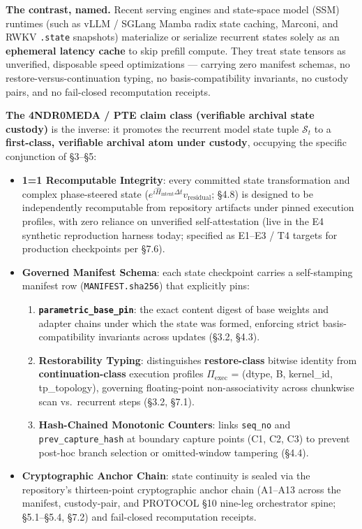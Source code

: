 \documentclass[11pt]{article}
\providecommand{\tightlist}{\setlength{\itemsep}{0pt}\setlength{\parskip}{0pt}}
\begin{document}
\textbf{The contrast, named.} Recent serving engines and state-space model (SSM) runtimes (such as vLLM / SGLang Mamba radix state caching, Marconi, and RWKV \texttt{.state} snapshots) materialize or serialize recurrent states solely as an \textbf{ephemeral latency cache} to skip prefill compute. They treat state tensors as unverified, disposable speed optimizations --- carrying zero manifest schemas, no restore-versus-continuation typing, no basis-compatibility invariants, no custody pairs, and no fail-closed recomputation receipts.

\textbf{The 4NDR0MEDA / PTE claim class (verifiable archival state custody)} is the inverse: it promotes the recurrent model state tuple \(\mathcal{S}_t\) to a \textbf{first-class, verifiable archival atom under custody}, occupying the specific conjunction of \S{}3--\S{}5:

\begin{itemize}
\tightlist
\item
  \textbf{1=1 Recomputable Integrity}: every committed state transformation and complex phase-steered state (\(e^{i\hat{H}_{\text{intent}}\Delta t} v_{\text{residual}}\); \S{}4.8) is designed to be independently recomputable from repository artifacts under pinned execution profiles, with zero reliance on unverified self-attestation (live in the E4 synthetic reproduction harness today; specified as E1--E3 / T4 targets for production checkpoints per \S{}7.6).
\item
  \textbf{Governed Manifest Schema}: each state checkpoint carries a self-stamping manifest row (\texttt{MANIFEST.sha256}) that explicitly pins:

  \begin{enumerate}
  \def\labelenumi{\arabic{enumi}.}
  \tightlist
  \item
    \textbf{\texttt{parametric\_base\_pin}}: the exact content digest of base weights and adapter chains under which the state was formed, enforcing strict basis-compatibility invariants across updates (\S{}3.2, \S{}4.3).
  \item
    \textbf{Restorability Typing}: distinguishes \textbf{restore-class} bitwise identity from \textbf{continuation-class} execution profiles \(\Pi_{\text{exec}}\) = (dtype, B, kernel\_id, tp\_topology), governing floating-point non-associativity across chunkwise scan vs.~recurrent steps (\S{}3.2, \S{}7.1).
  \item
    \textbf{Hash-Chained Monotonic Counters}: links \texttt{seq\_no} and \texttt{prev\_capture\_hash} at boundary capture points (C1, C2, C3) to prevent post-hoc branch selection or omitted-window tampering (\S{}4.4).
  \end{enumerate}
\item
  \textbf{Cryptographic Anchor Chain}: state continuity is sealed via the repository's thirteen-point cryptographic anchor chain (A1--A13 across the manifest, custody-pair, and PROTOCOL \S{}10 nine-leg orchestrator spine; \S{}5.1--\S{}5.4, \S{}7.2) and fail-closed recomputation receipts.
\end{itemize}
\end{document}
